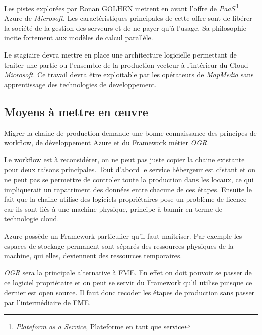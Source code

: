 Les pistes explorées par Ronan GOLHEN mettent en avant l'offre de
\textit{PaaS}\,\footnote{\textit{Plateform as a Service}, Plateforme
  en tant que service} Azure de \textit{Microsoft}. Les
caractéristiques principales de cette offre sont de libérer la société
de la gestion des serveurs et de ne payer qu'à l'usage. Sa philosophie
incite fortement aux modèles de calcul parallèle.

Le stagiaire devra mettre en place une architecture logicielle
permettant de traiter une partie ou l'ensemble de la production
vecteur à l'intérieur du Cloud \textit{Microsoft}. Ce travail devra
être exploitable par les opérateurs de \textit{MapMedia} sans
apprentissage des technologies de developpement.




\subsection{Moyens à mettre en œuvre}
Migrer la chaine de production demande une bonne connaissance des
principes de workflow, de développement Azure et du Framework métier
\textit{OGR}.

 Le workflow est à reconsidérer, on ne peut pas juste copier la chaine
 existante pour deux raisons principales. Tout d'abord le service
 hébergeur est distant et on ne peut pas se permettre de controler
 toute la production dans les locaux, ce qui impliquerait un
 rapatriment des données entre chacune de ces étapes. Ensuite le
 fait que la chaine utilise des logiciels propriétaires pose un
 problème de licence car ils sont liés à une machine physique,
 principe à bannir en terme de technologie cloud.

Azure possède un Framework particulier qu'il faut maitriser. Par
exemple les espaces de stockage permanent sont séparés des ressources
physiques de la machine, qui elles, deviennent des ressources
temporaires.

 \textit{OGR} sera la principale alternative à FME. En effet on doit
 pouvoir se passer de ce logiciel propriétaire et on peut se servir du
 Framework qu'il utilise puisque ce dernier est open source. Il faut
 donc recoder les étapes de production sans passer par l'intermédiaire
 de FME.



